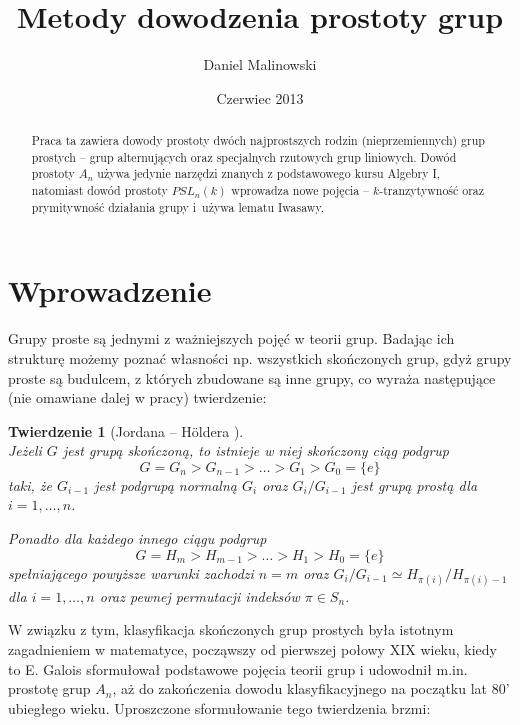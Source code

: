 \documentclass[licencjacka]{pracamgr}
\author{Daniel Malinowski}
\title{Metody dowodzenia prostoty grup}
\date{Czerwiec 2013}
\newtheorem*{thh2}{Twierdzenie}
\begin{document}
\maketitle

\begin{abstract}
  Praca ta zawiera dowody prostoty dwóch najprostszych rodzin (nieprzemiennych) grup prostych --
  grup alternujących oraz specjalnych rzutowych grup liniowych.
  Dowód prostoty $A_n$ używa jedynie narzędzi znanych z podstawowego kursu Algebry I,
  natomiast dowód prostoty $PSL_n(k)$ wprowadza nowe pojęcia -- $k$-tranzytywność
  oraz prymitywność działania grupy i~używa lematu Iwasawy.
\end{abstract}

\tableofcontents


\chapter*{Wprowadzenie}

Grupy proste są jednymi z ważniejszych pojęć w teorii grup.
Badając ich strukturę możemy poznać własności np. wszystkich skończonych grup,
gdyż grupy proste są budulcem, z których zbudowane są inne grupy, co wyraża następujące
(nie omawiane dalej w pracy) twierdzenie:
\begin{thh2}[{Jordana -- H\"oldera  \cite[tw. 11.9.]{BB}}] $ $ \\
  Jeżeli $G$ jest grupą skończoną, to istnieje w niej skończony ciąg podgrup
    $$ G = G_n > G_{n-1} > \ldots > G_1 > G_0 = \{e\} $$
  taki, że $G_{i-1}$ jest podgrupą normalną $G_{i}$ oraz $G_{i}/G_{i-1}$ jest grupą prostą dla $i = 1, \ldots, n$.

  Ponadto dla każdego innego ciągu podgrup
    $$ G = H_m > H_{m-1} > \ldots > H_1 > H_0 = \{e\} $$
  spełniającego powyższe warunki zachodzi $n = m$ oraz $G_{i}/G_{i-1} \simeq H_{\pi(i)}/H_{\pi(i)-1}$ 
  dla $i = 1, \ldots, n$ oraz pewnej permutacji indeksów $\pi \in S_{n}$.
\end{thh2}

W związku z tym, klasyfikacja skończonych grup prostych była istotnym zagadnieniem w matematyce,
począwszy od pierwszej połowy XIX wieku, kiedy to E. Galois sformułował podstawowe
pojęcia teorii grup i udowodnił m.in. prostotę grup $A_n$, 
aż do zakończenia dowodu klasyfikacyjnego na początku lat 80' ubiegłego wieku.
Uproszczone sformułowanie tego twierdzenia brzmi:
\end{document}
